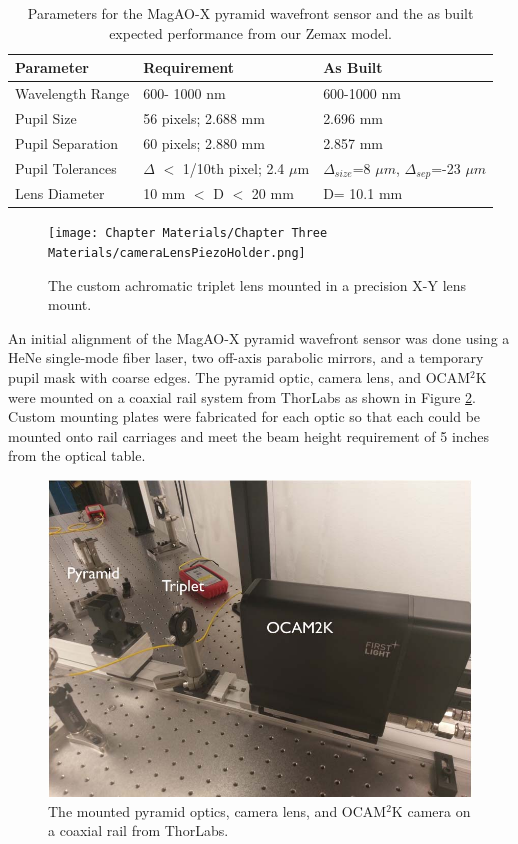 	
\begin{table}
	\begin{center}
		\begin{tabular}{ | l| l |  l |}
			\hline
			\textbf{Parameter}& \textbf{Requirement} & \textbf{As Built}\\ \hline
			Wavelength Range &600- 1000 nm& 600-1000 nm\\ \hline
			Pupil Size & 56 pixels; 2.688 mm& 2.696 mm\\ \hline
			Pupil Separation & 60 pixels; 2.880 mm& 2.857 mm \\ \hline
			Pupil Tolerances & $\Delta$ $<$ 1/10th pixel; 2.4 $\mu$m& $\Delta_{size}$=8 $\mu m$,  $\Delta_{sep}$=-23 $\mu m$ \\ \hline
			Lens Diameter & 10 mm $<$ D  $<$ 20 mm & D= 10.1 mm\\ \hline
				
		\end{tabular}
	\end{center}
	\caption{Parameters for the MagAO-X pyramid wavefront sensor and the as built expected performance from our Zemax model.}
	\label{tab:asbuilt}
\end{table}



\begin{figure}
    \centering
    \texttt{[image: Chapter Materials/Chapter Three Materials/cameraLensPiezoHolder.png]}
    \caption{The custom achromatic triplet lens mounted in a precision X-Y lens mount.}
    \label{fig:mountedtriplet}
\end{figure}
	
An initial alignment of the MagAO-X pyramid wavefront sensor was done using a HeNe single-mode fiber laser, two off-axis parabolic mirrors, and a temporary pupil mask with coarse edges. The pyramid optic, camera lens, and OCAM$^2$K were mounted on a coaxial rail system from ThorLabs as shown in Figure \ref{fig:mountedPWFS}. Custom mounting plates were fabricated for each optic so that each could be mounted onto rail carriages and meet the beam height requirement of 5 inches from the optical table. 

\begin{figure}
    \centering
    \includegraphics[width=.8\textwidth]{Chapter Materials/Chapter Three Materials/mountedPWFS.jpg}
    \caption{The mounted pyramid optics, camera lens, and OCAM$^2$K camera on a coaxial rail from ThorLabs.}
    \label{fig:mountedPWFS}
\end{figure}

